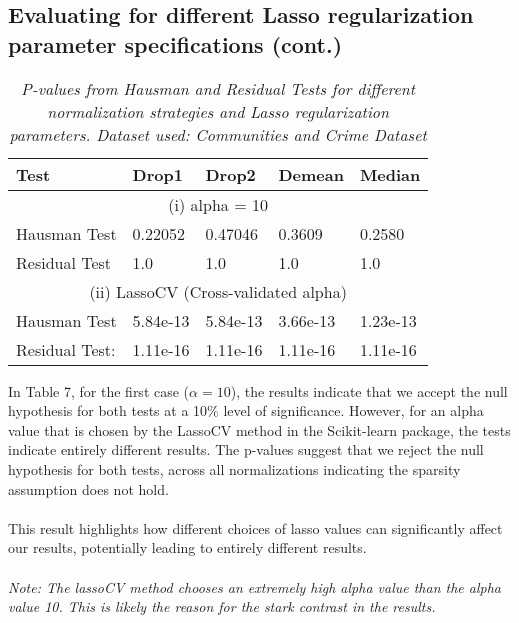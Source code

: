 \subsection{Evaluating for different Lasso regularization parameter specifications (cont.)}
\begin{table}[h!]
\renewcommand{\arraystretch}{1.5}
\centering
\begin{tabular}{||l l l l l||} 
 \hline
 \hline
 Test & Drop1 & Drop2 &  Demean & Median \\ [0.5ex] 
 \hline \hline
 \multicolumn{5}{||c||}{(i) alpha = 10} \\ [0.5ex]
 Hausman Test & 0.22052 & 0.47046 & 0.3609 & 0.2580 \\ 
 Residual Test & 1.0 & 1.0 & 1.0 & 1.0 \\
 \hline
 \multicolumn{5}{||c||}{(ii) LassoCV (Cross-validated alpha) } \\ [0.5ex]
 Hausman Test & 5.84e-13 & 5.84e-13 & 3.66e-13 & 1.23e-13 \\ 
 Residual Test: & 1.11e-16 & 1.11e-16  & 1.11e-16 & 1.11e-16 \\ [1ex] 
 \hline \hline
\end{tabular}
\caption{\textit{P-values from Hausman and Residual Tests for different normalization strategies and Lasso regularization parameters. Dataset used: Communities and Crime Dataset}}
\label{table:1}
\end{table}

In Table 7, for the first case ($\alpha = 10$), the results indicate that we accept the null hypothesis for both tests at a 10\% level of significance. However, for an alpha value that is chosen by the LassoCV method in the Scikit-learn package, the tests indicate entirely different results. The p-values suggest that we reject the null hypothesis for both tests, across all normalizations indicating the sparsity assumption does not hold.\\ 
\\
This result highlights how different choices of lasso values can significantly affect our results, potentially leading to entirely different results. \\
\\
\textit{Note: The lassoCV method chooses an extremely high alpha value than the alpha value 10. This is likely the reason for the stark contrast in the results.}


